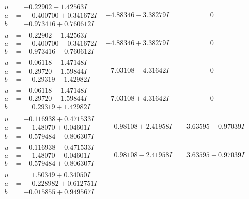 \documentclass[1p]{elsarticle_modified}
\theoremstyle{definition}
\begin{document}
$$\begin{array}{c|c|c}
\begin{aligned}
u &= -0.22902 + 1.42563 I \\
a &= \phantom{-}0.400700 + 0.341672 I \\
b &= -0.973416 + 0.760612 I\end{aligned}
 & -4.88346 - 3.38279 I & \phantom{-0.000000 } 0 \\ \hline\begin{aligned}
u &= -0.22902 - 1.42563 I \\
a &= \phantom{-}0.400700 - 0.341672 I \\
b &= -0.973416 - 0.760612 I\end{aligned}
 & -4.88346 + 3.38279 I & \phantom{-0.000000 } 0 \\ \hline\begin{aligned}
u &= -0.06118 + 1.47148 I \\
a &= -0.29720 - 1.59844 I \\
b &= \phantom{-}0.29319 - 1.42982 I\end{aligned}
 & -7.03108 - 4.31642 I & \phantom{-0.000000 } 0 \\ \hline\begin{aligned}
u &= -0.06118 - 1.47148 I \\
a &= -0.29720 + 1.59844 I \\
b &= \phantom{-}0.29319 + 1.42982 I\end{aligned}
 & -7.03108 + 4.31642 I & \phantom{-0.000000 } 0 \\ \hline\begin{aligned}
u &= -0.116938 + 0.471533 I \\
a &= \phantom{-}1.48070 + 0.04601 I \\
b &= -0.579484 - 0.806307 I\end{aligned}
 & \phantom{-}0.98108 + 2.41958 I & \phantom{-}3.63595 + 0.97039 I \\ \hline\begin{aligned}
u &= -0.116938 - 0.471533 I \\
a &= \phantom{-}1.48070 - 0.04601 I \\
b &= -0.579484 + 0.806307 I\end{aligned}
 & \phantom{-}0.98108 - 2.41958 I & \phantom{-}3.63595 - 0.97039 I \\ \hline\begin{aligned}
u &= \phantom{-}1.50349 + 0.34050 I \\
a &= \phantom{-}0.228982 + 0.612751 I \\
b &= -0.015855 + 0.949567 I\end{aligned}

\end{array}$$
\end{document}
